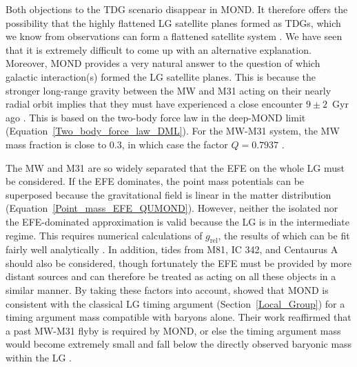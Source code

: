 \documentclass[fleqn,usenatbib,useAMS]{mnras} %
\begin{document}
Both objections to the TDG scenario disappear in MOND. It therefore offers the possibility that the highly flattened LG satellite planes formed as TDGs, which we know from observations can form a flattened satellite system \citep{Mirabel_1992, Bournaud_2004}. We have seen that it is extremely difficult to come up with an alternative explanation. Moreover, MOND provides a very natural answer to the question of which galactic interaction(s) formed the LG satellite planes. This is because the stronger long-range gravity between the MW and M31 acting on their nearly radial orbit \citep{Van_der_Marel_2012, Van_der_Marel_2019, Salomon_2021} implies that they must have experienced a close encounter $9 \pm 2$~Gyr ago \citep{Zhao_2013}. This is based on the two-body force law in the deep-MOND limit (Equation~\ref{Two_body_force_law_DML}). For the MW-M31 system, the MW mass fraction is close to 0.3, in which case the factor $Q = 0.7937$ \citep{Banik_Ryan_2018}.

The MW and M31 are so widely separated that the EFE on the whole LG must be considered. If the EFE dominates, the point mass potentials can be superposed because the gravitational field is linear in the matter distribution (Equation~\ref{Point_mass_EFE_QUMOND}). However, neither the isolated nor the EFE-dominated approximation is valid because the LG is in the intermediate regime. This requires numerical calculations of $g_\text{rel}$, the results of which can be fit fairly well analytically \citep{Banik_Ryan_2018}. In addition, tides from M81, IC 342, and Centaurus A should also be considered, though fortunately the EFE must be provided by more distant sources and can therefore be treated as acting on all these objects in a similar manner. By taking these factors into account, \citet{Banik_Ryan_2018} showed that MOND is consistent with the classical LG timing argument (Section~\ref{Local_Group}) for a timing argument mass compatible with baryons alone. Their work reaffirmed that a past MW-M31 flyby is required by MOND, or else the timing argument mass would become extremely small and fall below the directly observed baryonic mass within the LG \citep[see also][]{Benisty_2020, McLeod_2020}.
\end{document}
